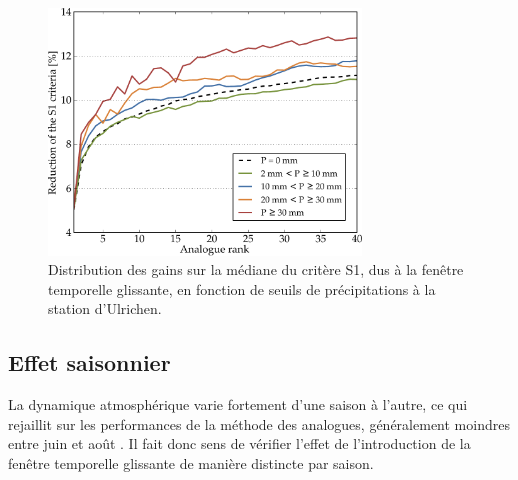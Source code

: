 \documentclass[hess]{copernicus}
\begin{document}
\begin{figure}[htb]
	\begin{center}
		\includegraphics[width=8.3cm]{figures/changes_S1_precip_threshold.pdf}
	\end{center}
	\caption{Distribution des gains sur la médiane du critère S1, dus à la fenêtre temporelle glissante, en fonction de seuils de précipitations à la station d'Ulrichen.}
	\label{fig:Graphique_fenetre_glissante_chmts_S1_seuils_precip}
\end{figure}


\subsection{Effet saisonnier}
\label{sec:ameliorations:fenetre:S1_saisons}

La dynamique atmosphérique varie fortement d'une saison à l'autre, ce qui rejaillit sur les performances de la méthode des analogues, généralement moindres entre juin et août \citep{Bliefernicht2010}. Il fait donc sens de vérifier l'effet de l'introduction de la fenêtre temporelle glissante de manière distincte par saison.
\end{document}
